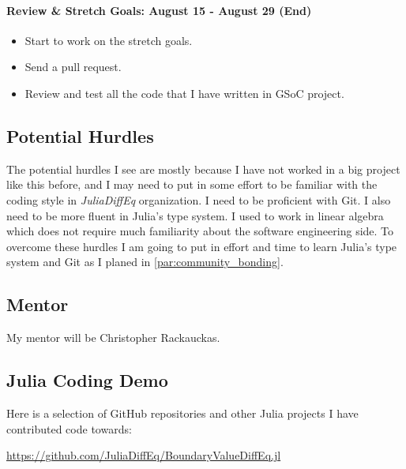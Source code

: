 \documentclass[a4paper,11pt,onecolumn]{article}
\begin{document}
\paragraph{Review \& Stretch Goals: August 15 - August 29 (End)} %
\label{par:review_&_stretch_goals_august_15_august_29}
\begin{itemize}
	\item Start to work on the stretch goals.
	\item Send a pull request.
	\item Review and test all the code that I have written in GSoC project.
\end{itemize}

\subsection{Potential Hurdles} %
\label{sub:potential_hurdles}
The potential hurdles I see are mostly because I have not worked in a big project like
this before, and I may need to put in some effort to be familiar with the coding style in \textit{JuliaDiffEq}
organization. I need to be proficient with Git. I also need to be more fluent in Julia's
type system. I used to work in linear algebra which does not require much familiarity
about the software engineering side. To overcome these hurdles I am going to put in effort
and time to learn Julia's type system and Git as I planed in \ref{par:community_bonding}.

\subsection{Mentor} %
\label{sub:mentor}
My mentor will be Christopher Rackauckas.



\subsection{Julia Coding Demo} %
\label{ssub:julia_coding_demo}
Here is a selection of GitHub repositories and other Julia projects I have contributed code towards:

\url{https://github.com/JuliaDiffEq/BoundaryValueDiffEq.jl}
\end{document}
